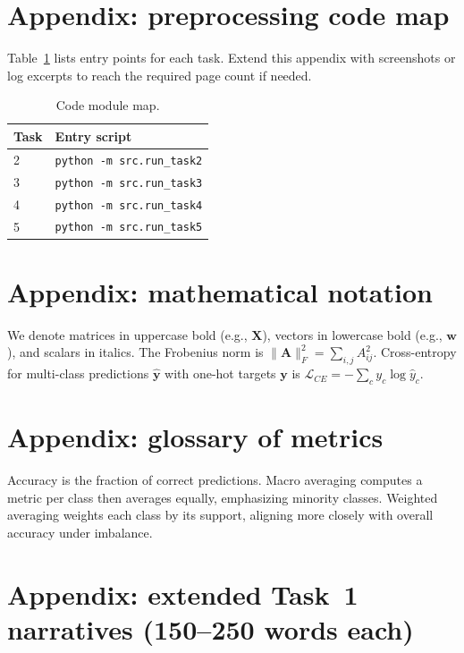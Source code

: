 \documentclass[11pt,a4paper]{article}
\begin{document}
\section{Appendix: preprocessing code map}
Table~\ref{tab:code-map} lists entry points for each task. Extend this appendix with screenshots or log excerpts to reach the required page count if needed.

\begin{table}[htbp]
\centering
\caption{Code module map.}
\label{tab:code-map}
\begin{tabular}{@{}ll@{}}
\toprule
Task & Entry script \\
\midrule
2 & \texttt{python -m src.run\_task2} \\
3 & \texttt{python -m src.run\_task3} \\
4 & \texttt{python -m src.run\_task4} \\
5 & \texttt{python -m src.run\_task5} \\
\bottomrule
\end{tabular}
\end{table}

\section{Appendix: mathematical notation}
We denote matrices in uppercase bold (e.g., $\mathbf{X}$), vectors in lowercase bold (e.g., $\mathbf{w}$), and scalars in italics. The Frobenius norm is $\|\mathbf{A}\|_F^2 = \sum_{i,j} A_{ij}^2$. Cross-entropy for multi-class predictions $\hat{\mathbf{y}}$ with one-hot targets $\mathbf{y}$ is $\mathcal{L}_{CE} = -\sum_{c} y_c \log \hat{y}_c$.

\section{Appendix: glossary of metrics}
Accuracy is the fraction of correct predictions. Macro averaging computes a metric per class then averages equally, emphasizing minority classes. Weighted averaging weights each class by its support, aligning more closely with overall accuracy under imbalance.

\section{Appendix: extended Task~1 narratives (150--250 words each)}
\end{document}
